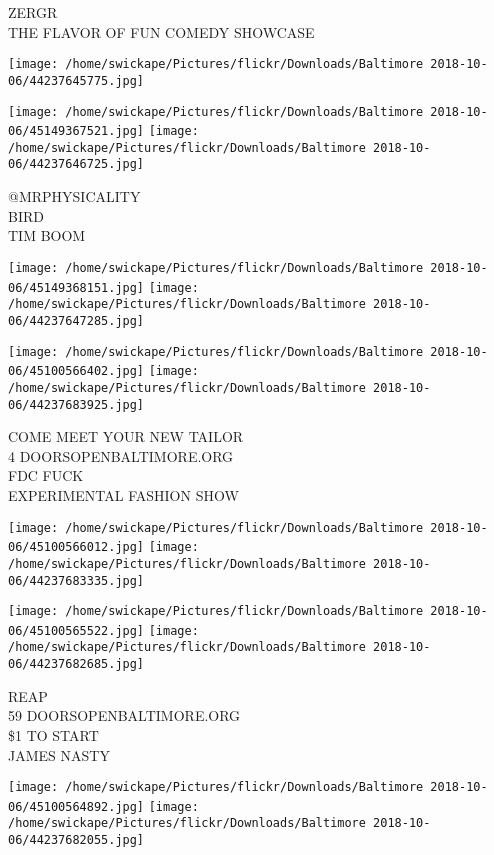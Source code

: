 \documentclass[10pt,letterpaper]{article}
\begin{document}
ZERGR\\
THE FLAVOR OF FUN COMEDY SHOWCASE
\pagebreak

\texttt{[image: /home/swickape/Pictures/flickr/Downloads/Baltimore 2018-10-06/44237645775.jpg]}

\vspace{0.25in}
\texttt{[image: /home/swickape/Pictures/flickr/Downloads/Baltimore 2018-10-06/45149367521.jpg]}
\texttt{[image: /home/swickape/Pictures/flickr/Downloads/Baltimore 2018-10-06/44237646725.jpg]}

@MRPHYSICALITY\\
BIRD\\
TIM BOOM
\pagebreak

\texttt{[image: /home/swickape/Pictures/flickr/Downloads/Baltimore 2018-10-06/45149368151.jpg]}
\texttt{[image: /home/swickape/Pictures/flickr/Downloads/Baltimore 2018-10-06/44237647285.jpg]}

\texttt{[image: /home/swickape/Pictures/flickr/Downloads/Baltimore 2018-10-06/45100566402.jpg]}
\texttt{[image: /home/swickape/Pictures/flickr/Downloads/Baltimore 2018-10-06/44237683925.jpg]}

COME MEET YOUR NEW TAILOR\\
4 DOORSOPENBALTIMORE.ORG\\
FDC FUCK\\
EXPERIMENTAL FASHION SHOW
\pagebreak

\texttt{[image: /home/swickape/Pictures/flickr/Downloads/Baltimore 2018-10-06/45100566012.jpg]}
\texttt{[image: /home/swickape/Pictures/flickr/Downloads/Baltimore 2018-10-06/44237683335.jpg]}

\texttt{[image: /home/swickape/Pictures/flickr/Downloads/Baltimore 2018-10-06/45100565522.jpg]}
\texttt{[image: /home/swickape/Pictures/flickr/Downloads/Baltimore 2018-10-06/44237682685.jpg]}

REAP\\
59 DOORSOPENBALTIMORE.ORG\\
\$1 TO START\\
JAMES NASTY
\pagebreak

\texttt{[image: /home/swickape/Pictures/flickr/Downloads/Baltimore 2018-10-06/45100564892.jpg]}
\texttt{[image: /home/swickape/Pictures/flickr/Downloads/Baltimore 2018-10-06/44237682055.jpg]}
\end{document}

